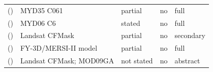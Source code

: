 \begin{table}[!htbp]
\begin{tabular}{@{}>{\raggedright\arraybackslash}p{3.4cm}>{\raggedright\arraybackslash}p{4.6cm}>{\raggedright\arraybackslash}p{1.9cm}>{\raggedright\arraybackslash}p{1.6cm}>{\raggedright\arraybackslash}p{1.5cm}@{}}
\citeauthor{nguyenhuu2025} (\citeyear{nguyenhuu2025}) & MYD35 C061 & partial & no & full \\
\citeauthor{wang2016} (\citeyear{wang2016}) & MYD06 C6 & stated & no & full \\
\citeauthor{foga2017} (\citeyear{foga2017}) & Landsat CFMask & partial & no & secondary \\
\citeauthor{wang2022} (\citeyear{wang2022}) & FY-3D/MERSI-II model & partial & no & full \\
\citeauthor{stillinger2019} (\citeyear{stillinger2019}) & Landsat CFMask; MOD09GA & not stated & no & abstract \\
\bottomrule
\end{tabular}
\end{table}
